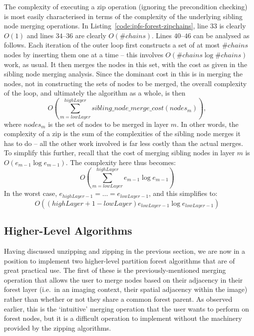 The complexity of executing a zip operation (ignoring the precondition checking) is most easily characterised in terms of the complexity of the underlying sibling node merging operations. In Listing~\ref{code:ipfs-forest-zipchains}, line $33$ is clearly $O(1)$ and lines $34$--$36$ are clearly $O(\#\mathit{chains})$. Lines $40$--$46$ can be analysed as follows. Each iteration of the outer loop first constructs a set of at most $\#\mathit{chains}$ nodes by inserting them one at a time -- this involves $O(\#\mathit{chains} \log \#\mathit{chains})$ work, as usual. It then merges the nodes in this set, with the cost as given in the sibling node merging analysis. Since the dominant cost in this is in merging the nodes, not in constructing the sets of nodes to be merged, the overall complexity of the loop, and ultimately the algorithm as a whole, is then
%
\[
O\left( \sum_{m=\mathit{lowLayer}}^{\mathit{highLayer}} \mathit{sibling\_node\_merge\_cost}(\mathit{nodes}_m) \right),
\]
%
where $\mathit{nodes}_m$ is the set of nodes to be merged in layer $m$. In other words, the complexity of a zip is the sum of the complexities of the sibling node merges it has to do -- all the other work involved is far less costly than the actual merges. To simplify this further, recall that the cost of merging sibling nodes in layer $m$ is $O(e_{m-1} \log e_{m-1})$. The complexity here thus becomes:
%
\[
O\left( \sum_{m=\mathit{lowLayer}}^{\mathit{highLayer}} e_{m-1} \log e_{m-1} \right)
\]
%
In the worst case, $e_{\mathit{highLayer}-1} = \ldots = e_{\mathit{lowLayer}-1}$, and this simplifies to:
%
\[
O((highLayer+1-lowLayer) e_{\mathit{lowLayer}-1} \log e_{\mathit{lowLayer}-1})
\]


\afterpage{\clearpage}
\newpage

\subsection{Higher-Level Algorithms}

Having discussed unzipping and zipping in the previous section, we are now in a position to implement two higher-level partition forest algorithms that are of great practical use. The first of these is the previously-mentioned merging operation that allows the user to merge nodes based on their adjacency in their forest layer (i.e.~in an imaging context, their spatial adjacency within the image) rather than whether or not they share a common forest parent. As observed earlier, this is the `intuitive' merging operation that the user wants to perform on forest nodes, but it is a difficult operation to implement without the machinery provided by the zipping algorithms.

